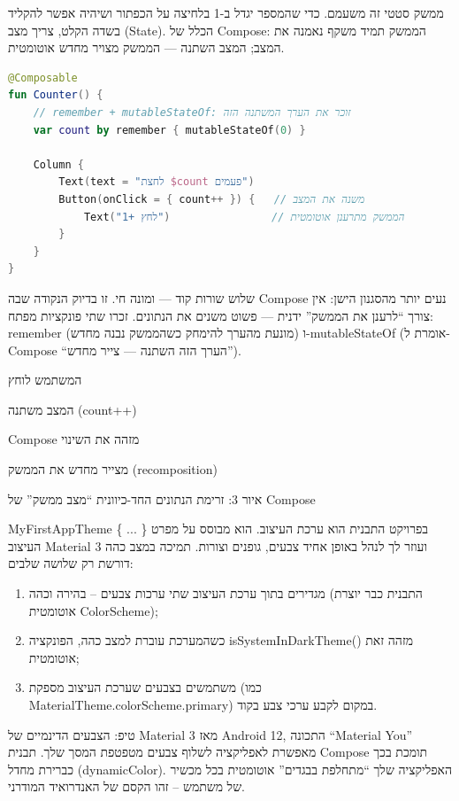 
ממשק סטטי זה משעמם. כדי שהמספר יגדל ב-1 בלחיצה על הכפתור ושיהיה אפשר להקליד בשדה הקלט, צריך מצב (State). הכלל של Compose: הממשק תמיד משקף נאמנה את המצב; המצב השתנה — הממשק מצויר מחדש אוטומטית.

\begin{lstlisting}[language=Kotlin]
@Composable
fun Counter() {
    // ‏remember + mutableStateOf: זוכר את הערך המשתנה הזה
    var count by remember { mutableStateOf(0) }

    Column {
        Text(text = "לחצת $count פעמים")
        Button(onClick = { count++ }) {   // משנה את המצב
            Text("לחץ +1")                // הממשק מתרענן אוטומטית
        }
    }
}
\end{lstlisting}

שלוש שורות קוד — ומונה חי. זו בדיוק הנקודה שבה Compose נעים יותר מהסגנון הישן: אין צורך “לרענן את הממשק” ידנית — פשוט משנים את הנתונים. זכרו שתי פונקציות מפתח: remember (מונעת מהערך להימחק כשהממשק נבנה מחדש) ו-mutableStateOf (אומרת ל-Compose “הערך הזה השתנה — צייר מחדש”).

המשתמש לוחץ

המצב משתנה (count++)

‏Compose מזהה את השינוי

מצייר מחדש את הממשק (recomposition)

\begin{center}\small\color{gray}איור 3: זרימת הנתונים החד-כיוונית “מצב ממשק” של Compose\end{center}


‏MyFirstAppTheme \{ ... \} בפרויקט התבנית הוא ערכת העיצוב. הוא מבוסס על מפרט העיצוב Material 3 ועוזר לך לנהל באופן אחיד צבעים, גופנים וצורות. תמיכה במצב כהה דורשת רק שלושה שלבים:

\begin{enumerate}
  \item מגדירים בתוך ערכת העיצוב שתי ערכות צבעים – בהירה וכהה (התבנית כבר יוצרת אוטומטית ColorScheme);
  \item כשהמערכת עוברת למצב כהה, הפונקציה isSystemInDarkTheme() מזהה זאת אוטומטית;
  \item משתמשים בצבעים שערכת העיצוב מספקת (כמו MaterialTheme.colorScheme.primary) במקום לקבע ערכי צבע בקוד.
\end{enumerate}

\begin{tcbinfo}{טיפ: הצבעים הדינמיים של Material 3}
מאז Android 12, התכונה “Material You” מאפשרת לאפליקציה לשלוף צבעים מטפטפת המסך שלך. תבנית Compose תומכת בכך כברירת מחדל (dynamicColor). האפליקציה שלך “מתחלפת בבגדים” אוטומטית בכל מכשיר של משתמש – זהו הקסם של האנדרואיד המודרני.

\end{tcbinfo}

